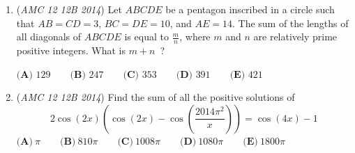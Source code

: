 \begin{enumerate}
	\item (\textit{AMC 12 12B 2014}) Let $ABCDE$ be a pentagon inscribed in a circle such that $AB = CD = 3$, $BC = DE = 10$, and $AE= 14$.  The sum of the lengths of all diagonals of $ABCDE$ is equal to $\frac{m}{n}$, where $m$ and $n$ are relatively prime positive integers.  What is $m+n$ ?


 $\textbf{(A) }129\qquad \textbf{(B) }247\qquad \textbf{(C) }353\qquad \textbf{(D) }391\qquad \textbf{(E) }421\qquad$


	\item (\textit{AMC 12 12B 2014}) Find the sum of all the positive solutions of 
 \[2\cos(2x) \left(\cos(2x) - \cos\left( \frac{2014\pi^2}{x} \right)\right) = \cos(4x) - 1\]
$\textbf{(A)}\ \pi \qquad\textbf{(B)}\ 810\pi  \qquad\textbf{(C)}\ 1008\pi \qquad\textbf{(D)}\ 1080 \pi \qquad\textbf{(E)}\ 1800\pi$


\end{enumerate}